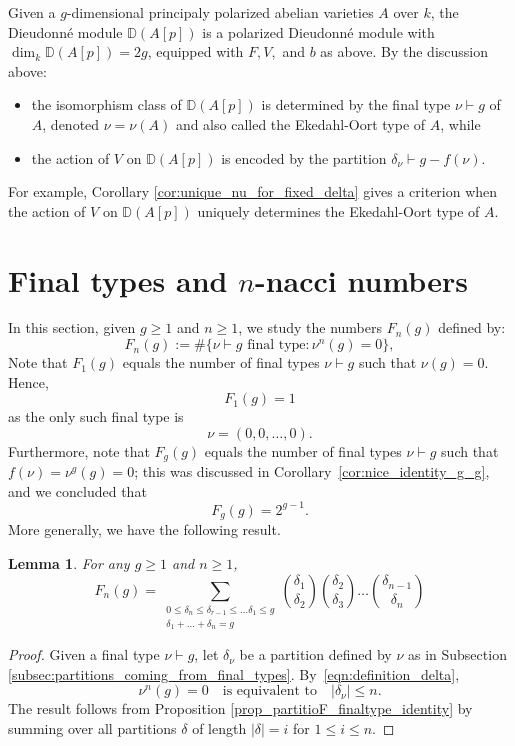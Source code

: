 \documentclass[11pt]{amsart}
\numberwithin{equation}{section}
\theoremstyle{plain}
\newcommand{\<}{\left \langle}
\renewcommand{\>}{\right \rangle}
\newtheorem{lem}[thm]{Lemma}
\theoremstyle{definition}
\theoremstyle{remark}
\begin{document}
Given a $g$-dimensional principaly polarized abelian varieties $A$ over $k$, the Dieudonn\'e module $\mathbb{D}(A[p])$ is a polarized Dieudonn\'e module with $\dim_k\mathbb{D}(A[p]) = 2g$, equipped with $F, V,$ and $b$ as above. By the discussion above:
\begin{itemize}
    \item the isomorphism class of $\mathbb{D}(A[p])$ is determined by the final type $\nu \vdash g$ of $A$, denoted $\nu = \nu(A)$ and also called the Ekedahl-Oort type of $A$, while
    \item  the action of $V$ on $\mathbb{D}(A[p])$ is encoded by the partition $\delta_\nu \vdash g - f(\nu)$. 
\end{itemize}
For example, Corollary \ref{cor:unique_nu_for_fixed_delta} gives a criterion when the action of $V$ on $\mathbb{D}(A[p])$ uniquely determines the Ekedahl-Oort type of $A$.

\section{Final types and $n$-nacci numbers}
\label{sec:sec3}
In this section, given $g \geq 1$ and $n \geq 1$, we study the numbers $F_n(g)$ defined by: 
\begin{equation}
F_{n}(g):=\#\{\nu \vdash g \text{ final type}: \nu^n(g) = 0\},
\label{eqn:F_n(g)_definition}
\end{equation}
 Note that $F_{1}(g)$ equals the number of final types $\nu \vdash g$ such that $\nu(g) = 0$. Hence, ~$${F_{1}(g) = 1}$$ as the only such final type is $$\nu = (0, 0, \ldots, 0).$$ Furthermore, note that $F_g(g)$ equals the number of final types $\nu \vdash g$ such that $f(\nu) = \nu^g(g) = 0$; this was discussed in Corollary~\ref{cor:nice_identity_g_g}, and we concluded that $$F_g(g) = 2^{g - 1}.$$ 
More generally, we have the following result. 

\begin{lem}
\label{lem:F_n(g)_defining_identity}
For any $g \geq 1$ and $n \geq 1$, 
\begin{equation}
F_n(g) = \sum_{\substack{0 \leq \delta_n \leq \delta_{r - 1} \leq \ldots \delta_1 \leq g \\ \delta_1 + \ldots + \delta_n = g}} {\delta_1 \choose \delta_2}{\delta_2 \choose \delta_3}\ldots {\delta_{n -1} \choose \delta_{n}}
\label{eqn:F_n(g)_defining_identity}
\end{equation}
\end{lem}
\begin{proof}
Given a final type $\nu \vdash g$, let $\delta_{\nu}$ be a partition defined by $\nu$ as in Subsection \ref{subsec:partitions_coming_from_final_types}. 
By~\eqref{eqn:definition_delta},  $$\nu^n(g) = 0\quad \text{is equivalent to}\quad|\delta_{\nu}| \leq n.$$ The result follows from Proposition \ref{prop_partitioF_finaltype_identity} by summing over all partitions $\delta$ of length $|\delta| = i$ for $1 \leq i \leq n$. 
\end{proof}
\end{document}
